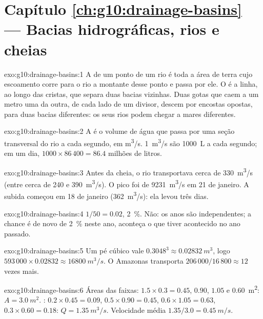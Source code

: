 \section*{Capítulo \ref{ch:g10:drainage-basins} --- Bacias hidrográficas, rios e cheias}

\begin{solution}{exo:g10:drainage-basins:1}
A  de um ponto de um rio é toda a área de terra cujo
escoamento corre para o rio a montante desse ponto e passa por ele. O
 é a linha, ao longo das cristas, que separa duas bacias
vizinhas. Duas gotas que caem a um metro uma da outra, de cada lado de um
divisor, descem por encostas opostas, para duas bacias diferentes: os seus
rios podem chegar a mares diferentes.
\end{solution}

\begin{solution}{exo:g10:drainage-basins:2}
A  é o volume de água que passa por uma seção transversal do rio a
cada segundo, em \unit{m^3/s}. \qty{1}{m^3/s} são \qty{1000}{L} a cada
segundo; em um dia, $1000 \times 86\,400 = 86.4$ milhões de litros.
\end{solution}

\begin{solution}{exo:g10:drainage-basins:3}
Antes da cheia, o rio transportava cerca de \qty{330}{m^3/s} (entre cerca de
\num{240} e \qty{390}{m^3/s}). O pico foi de \qty{9231}{m^3/s} em 21 de
janeiro. A subida começou em 18 de janeiro (\qty{362}{m^3/s}): ela levou
três dias.
\end{solution}

\begin{solution}{exo:g10:drainage-basins:4}
$1/50 = 0.02$, \qty{2}{\percent}. Não: os anos são independentes; a chance
é de novo de \qty{2}{\percent} neste ano, aconteça o que tiver acontecido no
ano passado.
\end{solution}

\begin{solution}{exo:g10:drainage-basins:5}
Um pé cúbico vale $0.3048^3 \approx \qty{0.02832}{m^3}$, logo
$593\,000 \times 0.02832 \approx \qty{16800}{m^3/s}$. O Amazonas transporta
$206\,000/16\,800 \approx 12$ vezes mais.
\end{solution}

\begin{solution}{exo:g10:drainage-basins:6}
Áreas das faixas: $1.5 \times 0.3 = 0.45$, $0.90$, $1.05$ e \qty{0.60}{m^2}:
$A = \qty{3.0}{m^2}$. : $0.2 \times 0.45 = 0.09$, $0.5 \times 0.90
= 0.45$, $0.6 \times 1.05 = 0.63$, $0.3 \times 0.60 = 0.18$: $Q =
\qty{1.35}{m^3/s}$. Velocidade média $1.35/3.0 = \qty{0.45}{m/s}$.
\end{solution}

